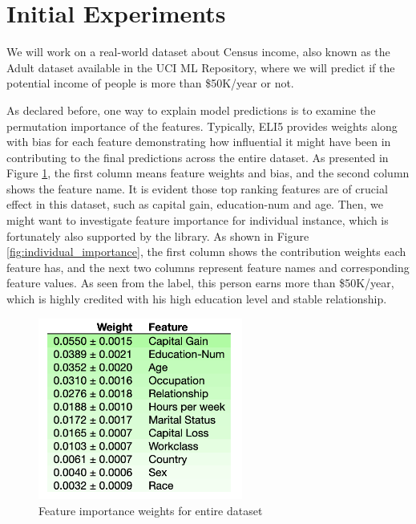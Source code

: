 \documentclass[runningheads]{llncs}
\begin{document}
	\section{Initial Experiments}
	
	We will work on a real-world dataset about Census income, also known as the Adult dataset available in the UCI ML Repository, where we will predict if the potential income of people is more than \$50K/year or not.
	
	As declared before, one way to explain model predictions is to examine the permutation importance of the features. Typically, ELI5\cite{eli5} provides weights along with bias for each feature demonstrating how influential it might have been in contributing to the final predictions across the entire dataset. As presented in Figure \ref{fig:feature_weights}, the first column means feature weights and bias, and the second column shows the feature name. It is evident those top ranking features are of crucial effect in this dataset, such as capital gain, education-num and age. Then, we might want to investigate feature importance for individual instance, which is fortunately also supported by the library. As shown in Figure \ref{fig:individual_importance}, the first column shows the contribution weights each feature has, and the next two columns represent feature names and corresponding feature values. As seen from the label, this person earns more than \$50K/year, which is highly credited with his high education level and stable relationship.
	
	\begin{figure}
		\centering
		\includegraphics[width=0.6\textwidth]{img/feature_weights.png}
		\caption{Feature importance weights for entire dataset}
		\label{fig:feature_weights}
	\end{figure}
\end{document}
